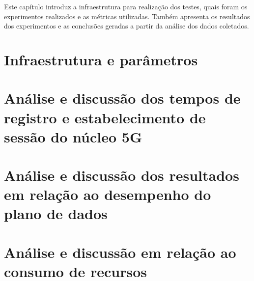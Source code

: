 Este capítulo introduz a infraestrutura para realização dos testes, quais foram os experimentos realizados e as métricas utilizadas. Também apresenta os resultados dos experimentos e as conclusões geradas a partir da análise dos dados coletados.

\section{Infraestrutura e parâmetros}
\label{sec:results-infrasctructure}


\section{Análise e discussão dos tempos de registro e estabelecimento de sessão do núcleo 5G}
\label{sec:results-connection-analysis}


\section{Análise e discussão dos resultados em relação ao desempenho do plano de dados}
\label{sec:results-dataplane-analysis}


\section{Análise e discussão em relação ao consumo de recursos}
\label{sec:results-resource-analysis}




